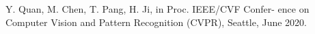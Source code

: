 Y. Quan, M. Chen, T. Pang, H. Ji, in Proc. IEEE/CVF Confer-
ence on Computer Vision and Pattern Recognition (CVPR),
Seattle, June 2020.
